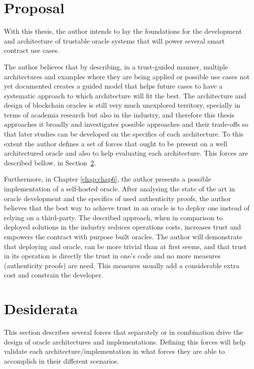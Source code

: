 \section{Proposal}

With this thesis, the author intends to lay the foundations for the development and architecture of trustable oracle systems that will power several smart contract use cases.

The author believes that by describing, in a trust-guided manner, multiple architectures and examples where they are being applied or possible use cases not yet documented creates a guided model that helps future cases to have a systematic approach to which architecture will fit the best. The architecture and design of blockchain oracles is still very much unexplored territory, specially in terms of academia research but also in the industry, and therefore this thesis approaches it broadly and investigates possible approaches and their trade-offs so that later studies can be developed on the specifics of each architecture. To this extent the author defines a set of forces that ought to be present on a well architectured oracle and also to help evaluating each architecture. This forces are described bellow, in Section~\ref{Desiderata}.

Furthermore, in Chapter \ref{chap:chap6}, the author presents a possible implementation of a self-hosted oracle. After analysing the state of the art in oracle development and the specifics of used authenticity proofs, the author believes that the best way to achieve trust in an oracle is to deploy one instead of relying on a third-party. The described approach, when in comparison to deployed solutions in the industry reduces operations costs, increases trust and empowers the contract with purpose built oracles. The author will demonstrate that deploying and oracle, can be more trivial than at first seems, and that trust in its operation is directly the trust in one's code and no more measures (authenticity proofs) are need. This measures usually add a considerable extra cost and constrain the developer.


\section{Desiderata}\label{Desiderata}
This section describes several forces that separately or in combination drive the design of oracle architectures and implementations. Defining this forces will help validate each architecture/implementation in what forces they are able to accomplish in their different scenarios.

